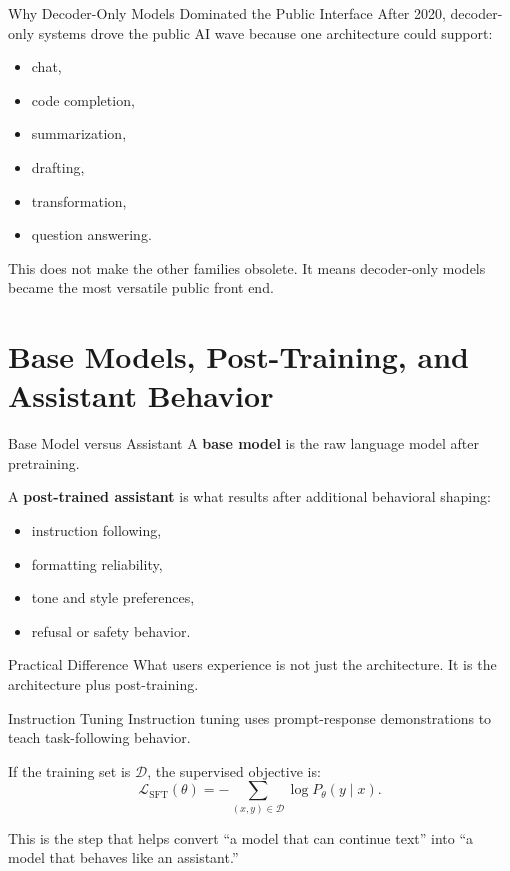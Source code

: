 \documentclass[12pt]{beamer}
\begin{document}
\begin{frame}{Why Decoder-Only Models Dominated the Public Interface}
  After 2020, decoder-only systems drove the public AI wave because one architecture could support:
  \begin{itemize}
    \item chat,
    \item code completion,
    \item summarization,
    \item drafting,
    \item transformation,
    \item question answering.
  \end{itemize}

  This does not make the other families obsolete. It means decoder-only models became the most versatile public front end.
\end{frame}

\section{Base Models, Post-Training, and Assistant Behavior}

\begin{frame}{Base Model versus Assistant}
  A \textbf{base model} is the raw language model after pretraining.

  A \textbf{post-trained assistant} is what results after additional behavioral shaping:
  \begin{itemize}
    \item instruction following,
    \item formatting reliability,
    \item tone and style preferences,
    \item refusal or safety behavior.
  \end{itemize}

  \begin{conceptbox}{Practical Difference}
    What users experience is not just the architecture. It is the architecture plus post-training.
  \end{conceptbox}
\end{frame}

\begin{frame}{Instruction Tuning}
  Instruction tuning uses prompt-response demonstrations to teach task-following behavior.

  If the training set is $\mathcal{D}$, the supervised objective is:
  \[
    \mathcal{L}_{\mathrm{SFT}}(\theta) = -\sum_{(x,y)\in \mathcal{D}} \log P_\theta(y\mid x).
  \]

  This is the step that helps convert ``a model that can continue text'' into ``a model that behaves like an assistant.''
\end{frame}
\end{document}
